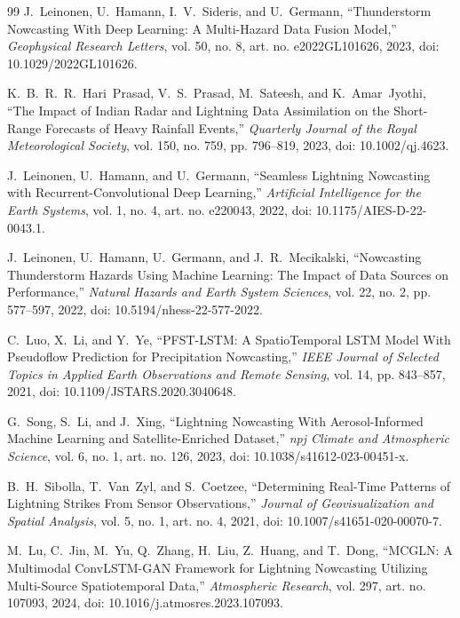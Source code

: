 \documentclass[12pt,a4paper]{report}
\begin{document}
\begin{thebibliography}{99}
J.~Leinonen, U.~Hamann, I.~V.~Sideris, and U.~Germann, ``Thunderstorm Nowcasting With Deep Learning: A Multi-Hazard Data Fusion Model,'' \emph{Geophysical Research Letters}, vol. 50, no. 8, art. no. e2022GL101626, 2023, doi: 10.1029/2022GL101626.

K.~B.~R.~R.~Hari~Prasad, V.~S.~Prasad, M.~Sateesh, and K.~Amar~Jyothi, ``The Impact of Indian Radar and Lightning Data Assimilation on the Short-Range Forecasts of Heavy Rainfall Events,'' \emph{Quarterly Journal of the Royal Meteorological Society}, vol. 150, no. 759, pp. 796--819, 2023, doi: 10.1002/qj.4623.

J.~Leinonen, U.~Hamann, and U.~Germann, ``Seamless Lightning Nowcasting with Recurrent-Convolutional Deep Learning,'' \emph{Artificial Intelligence for the Earth Systems}, vol. 1, no. 4, art. no. e220043, 2022, doi: 10.1175/AIES-D-22-0043.1.

J.~Leinonen, U.~Hamann, U.~Germann, and J.~R.~Mecikalski, ``Nowcasting Thunderstorm Hazards Using Machine Learning: The Impact of Data Sources on Performance,'' \emph{Natural Hazards and Earth System Sciences}, vol. 22, no. 2, pp. 577--597, 2022, doi: 10.5194/nhess-22-577-2022.

C.~Luo, X.~Li, and Y.~Ye, ``PFST-LSTM: A SpatioTemporal LSTM Model With Pseudoflow Prediction for Precipitation Nowcasting,'' \emph{IEEE Journal of Selected Topics in Applied Earth Observations and Remote Sensing}, vol. 14, pp. 843--857, 2021, doi: 10.1109/JSTARS.2020.3040648.

G.~Song, S.~Li, and J.~Xing, ``Lightning Nowcasting With Aerosol-Informed Machine Learning and Satellite-Enriched Dataset,'' \emph{npj Climate and Atmospheric Science}, vol. 6, no. 1, art. no. 126, 2023, doi: 10.1038/s41612-023-00451-x.

B.~H.~Sibolla, T.~Van~Zyl, and S.~Coetzee, ``Determining Real-Time Patterns of Lightning Strikes From Sensor Observations,'' \emph{Journal of Geovisualization and Spatial Analysis}, vol. 5, no. 1, art. no. 4, 2021, doi: 10.1007/s41651-020-00070-7.

M.~Lu, C.~Jin, M.~Yu, Q.~Zhang, H.~Liu, Z.~Huang, and T.~Dong, ``MCGLN: A Multimodal ConvLSTM-GAN Framework for Lightning Nowcasting Utilizing Multi-Source Spatiotemporal Data,'' \emph{Atmospheric Research}, vol. 297, art. no. 107093, 2024, doi: 10.1016/j.atmosres.2023.107093.


\end{thebibliography}
\end{document}
